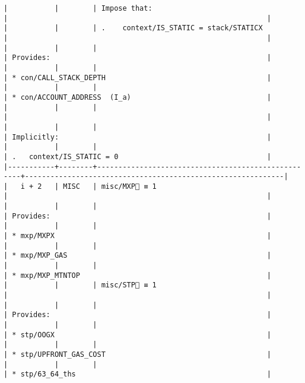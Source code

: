 \documentclass[varwidth=\maxdimen,margin=0.5cm,multi={verbatim}]{standalone}
\begin{document}
\begin{verbatim}
|           |        | Impose that:                                       |                                                             |
|           |        | .    context/IS_STATIC = stack/STATICX             |                                                             |
|           |        |                                                    | Provides:                                                   |
|           |        |                                                    | * con/CALL_STACK_DEPTH                                      |
|           |        |                                                    | * con/ACCOUNT_ADDRESS  (I_a)                                |
|           |        |                                                    |                                                             |
|           |        |                                                    | Implicitly:                                                 |
|           |        |                                                    | .   context/IS_STATIC = 0                                   |
|-----------+--------+----------------------------------------------------+-------------------------------------------------------------|
|   i + 2   | MISC   | misc/MXP🚩 ≡ 1                                     |                                                             |
|           |        |                                                    | Provides:                                                   |
|           |        |                                                    | * mxp/MXPX                                                  |
|           |        |                                                    | * mxp/MXP_GAS                                               |
|           |        |                                                    | * mxp/MXP_MTNTOP                                            |
|           |        | misc/STP🚩 ≡ 1                                     |                                                             |
|           |        |                                                    | Provides:                                                   |
|           |        |                                                    | * stp/OOGX                                                  |
|           |        |                                                    | * stp/UPFRONT_GAS_COST                                      |
|           |        |                                                    | * stp/63_64_ths                                             |

\end{verbatim}
\end{document}
